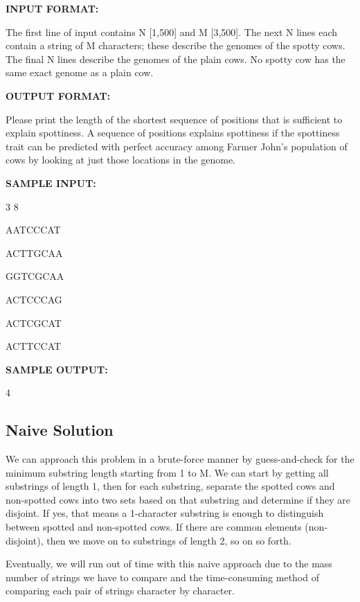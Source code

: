 \documentclass{article}
\begin{document}
{\bf INPUT FORMAT:}

The first line of input contains N [1,500] and M [3,500]. The next N lines each contain a string of M characters; these describe the genomes of the spotty cows. The final N lines describe the genomes of the plain cows. No spotty cow has the same exact genome as a plain cow.

\vspace{\baselineskip} 

{\bf OUTPUT FORMAT:}

Please print the length of the shortest sequence of positions that is sufficient to explain spottiness. A sequence of positions explains spottiness if the spottiness trait can be predicted with perfect accuracy among Farmer John's population of cows by looking at just those locations in the genome.

\vspace{\baselineskip}

{\bf SAMPLE INPUT:}

3 8

AATCCCAT

ACTTGCAA

GGTCGCAA

ACTCCCAG

ACTCGCAT

ACTTCCAT

\vspace{\baselineskip} 

{\bf SAMPLE OUTPUT:}

4
\subsection{Naive Solution}
We can approach this problem in a brute-force manner by guess-and-check for the minimum substring length starting from 1 to M. We can start by getting all substrings of length 1, then for each substring, separate the spotted cows and non-spotted cows into two sets based on that substring and determine if they are disjoint. If yes, that means a 1-character substring is enough to distinguish between spotted and non-spotted cows. If there are common elements (non-disjoint), then we move on to substrings of length 2, so on so forth. 

\vspace{\baselineskip} 
Eventually, we will run out of time with this naive approach due to the mass number of strings we have to compare and the time-consuming method of comparing each pair of strings character by character.
\end{document}
